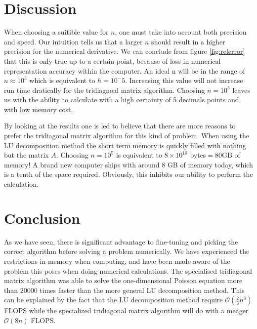 \documentclass[10pt, a4paper]{amsart}
\begin{document}
\section{Discussion}
When choosing a suitible value for $n$, one must take into account both precision and speed. Our intuition tells us that a larger $n$ should result in a higher precision for the numerical derivative. We can conclude from figure \ref{fig:relerror} that this is only true up to a certain point, because of loss in numerical representation accuracy within the computer. An ideal n will be in the range of $n\approx 10^5$ which is equivalent to $h=10^-5$. Increasing this value will not increase run time dratically for the tridiagnoal matrix algorithm. Choosing $n=10^5$ leaves us with the ability to calculate with a high certainty of 5 decimals points and with low memory cost. 

By looking at the results one is led to believe that there are more reasons to prefer the tridiagonal matrix algorithm for this kind of problem. When using the LU decomposition method the short term memory is quickly filled with nothing but the matrix $A$. Choosing $n=10^5$ is equivalent to $8\times10^{10}$ bytes$=80$GB of memory! A brand new computer ships with around $8$ GB of memory today, which is a tenth of the space required. Obviously, this inhibits our ability to perform the calculation. 

\section{Conclusion}
As we have seen, there is significant advantage to fine-tuning and picking the correct algorithm before solving a problem numerically. We have experienced the restrictions in memory when computing, and have been made aware of the problem this poses when doing numerical calculations. The specialised tridiagonal matrix algorithm was able to solve the one-dimensional Poisson equation more than $20000$ times faster than the more general LU decomposition method. This can be explained by the fact that the LU decomposition method require $\mathcal{O}(\frac{2}{3}n^3)$ FLOPS while the specialized tridiagonal matrix algorithm will do with a meager $\mathcal{O}(8n)$ FLOPS.

\begin{thebibliography}{10}
\end{thebibliography}
\end{document}
